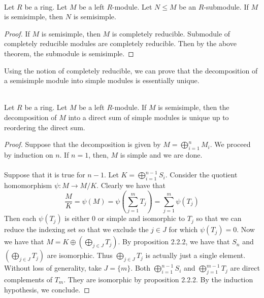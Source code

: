 \documentclass[a4paper]{article}
\begin{document}
\begin{crl}{}{}\\
Let $R$ be a ring. Let $M$ be a left $R$-module. Let $N\leq M$ be an $R$-submodule. If $M$ is semisimple, then $N$ is semisimple. 
\begin{proof}
If $M$ is semisimple, then $M$ is completely reducible. Submodule of completely reducible modules are completely reducible. Then by the above theorem, the submodule is semisimple. 
\end{proof}
\end{crl}

Using the notion of completely reducible, we can prove that the decomposition of a semisimple module into simple modules is essentially unique. 

\begin{prp}{}{}\\
Let $R$ be a ring. Let $M$ be a left $R$-module. If $M$ is semisimple, then the decomposition of $M$ into a direct sum of simple modules is unique up to reordering the direct sum. 
\begin{proof}
Suppose that the decomposition is given by $M=\bigoplus_{i=1}^nM_i$. We proceed by induction on $n$. If $n=1$, then, $M$ is simple and we are done. \\~\\

Suppose that it is true for $n-1$. Let $K=\bigoplus_{i=1}^{n-1}S_i$. Consider the quotient homomorphism $\psi:M\to M/K$. Clearly we have that $$\frac{M}{K}=\psi(M)=\psi\left(\sum_{j=1}^mT_j\right)=\sum_{j=1}^m\psi(T_j)$$ Then each $\psi(T_j)$ is either $0$ or simple and isomorphic to $T_j$ so that we can reduce the indexing set so that we exclude the $j\in J$ for which $\psi(T_j)=0$. Now we have that $M=K\oplus\left(\bigoplus_{j\in J}T_j\right)$. By proposition 2.2.2, we have that $S_n$ and $\left(\bigoplus_{j\in J}T_j\right)$ are isomorphic. Thus $\bigoplus_{j\in J}T_j$ is actually just a single element. Without loss of generality, take $J=\{m\}$. Both $\bigoplus_{i=1}^{n-1}S_i$ and $\bigoplus_{j=1}^{m-1}T_j$ are direct complements of $T_m$. They are isomorphic by proposition 2.2.2. By the induction hypothesis, we conclude. 
\end{proof}
\end{prp}
\end{document}
